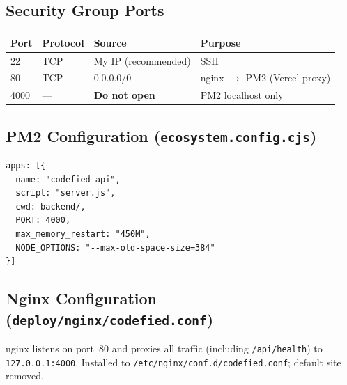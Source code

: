 \documentclass[11pt,a4paper]{article}
\begin{document}
\subsection{Security Group Ports}
\begin{table}[h]
\centering
\small
\begin{tabular}{@{}llll@{}}
\toprule
\textbf{Port} & \textbf{Protocol} & \textbf{Source} & \textbf{Purpose} \\
\midrule
22   & TCP & My IP (recommended) & SSH \\
80   & TCP & 0.0.0.0/0           & nginx $\rightarrow$ PM2 (Vercel proxy) \\
4000 & --- & \textbf{Do not open} & PM2 localhost only \\
\bottomrule
\end{tabular}
\end{table}

\subsection{PM2 Configuration (\texttt{ecosystem.config.cjs})}
\begin{lstlisting}[style=envfile]
apps: [{
  name: "codefied-api",
  script: "server.js",
  cwd: backend/,
  PORT: 4000,
  max_memory_restart: "450M",
  NODE_OPTIONS: "--max-old-space-size=384"
}]
\end{lstlisting}

\subsection{Nginx Configuration (\texttt{deploy/nginx/codefied.conf})}
nginx listens on port~80 and proxies all traffic (including \texttt{/api/health}) to \texttt{127.0.0.1:4000}. Installed to \texttt{/etc/nginx/conf.d/codefied.conf}; default site removed.
\end{document}
